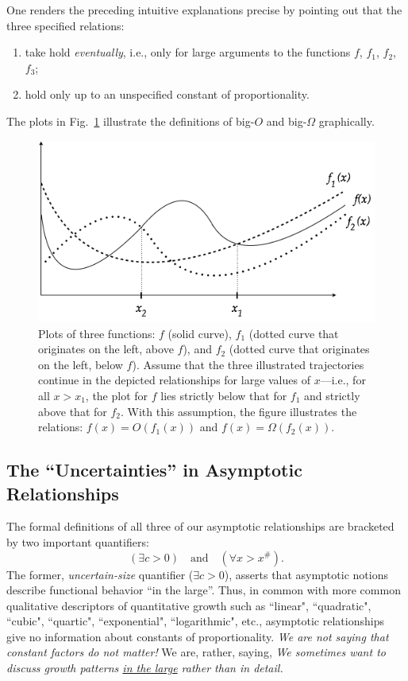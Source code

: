 One renders the preceding intuitive explanations precise by pointing out that the three specified relations:
\begin{enumerate}
\item
take hold {\em eventually}, i.e., only for large arguments to the functions $f$, $f_1$, $f_2$, $f_3$;
\item
hold only up to an unspecified constant of proportionality.
\end{enumerate}
The plots in Fig.~\ref{fig:Asymptotic} illustrate the definitions of big-$O$ and big-$\Omega$ graphically.
\begin{figure}[htb]
\begin{center}
       \includegraphics[scale=0.4]{FiguresArithmetic/NotationAsymptotic}
\caption{Plots of three functions: $f$ (solid curve), $f_1$ (dotted curve that originates on the left, above $f$), and $f_2$ (dotted curve that originates on the left, below $f$).  Assume that the three illustrated trajectories continue in the depicted relationships for large values of $x$---i.e., for all $x > x_1$, the plot for $f$ lies strictly below that for $f_1$ and strictly above that for $f_2$.  With this assumption, the figure illustrates the relations: $f(x) = O(f_1(x))$ and $f(x) = \Omega(f_2(x))$.}
\label{fig:Asymptotic}
\end{center}
\end{figure}

\subsection{The ``Uncertainties'' in Asymptotic Relationships}
\label{sec:uncertainties-asymptotics}

The formal definitions of all three of our asymptotic relationships are bracketed by two important quantifiers:
\[ 
(\exists c >0) \ \ \ \mbox{ and }  \ \ \  (\forall x > x^{\#}).
\]
The former, {\em uncertain-size} quantifier ($\exists c >0$), asserts that asymptotic notions describe functional behavior ``in the large''.  Thus, in common with more common qualitative descriptors of quantitative growth such as ``linear", ``quadratic", ``cubic", ``quartic", ``exponential", ``logarithmic", etc., asymptotic relationships give no information about constants of proportionality.  {\em We are not saying that constant factors do not matter!}  We are, rather, saying, {\em We sometimes want to discuss growth patterns \underline{in the large} rather than in detail.}

